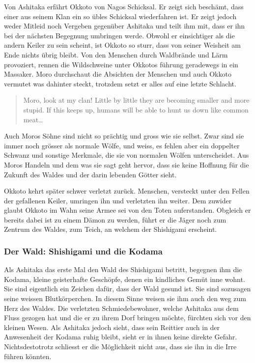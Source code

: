 Von Ashitaka erfährt Okkoto von Nagos Schicksal. Er zeigt sich beschämt, dass einer aus seinem Klan ein so übles Schicksal wiederfahren ist. Er zeigt jedoch weder Mitleid noch Vergeben gegenüber Ashitaka und teilt ihm mit, dass er ihn bei der nächsten Begegnung umbringen werde. Obwohl er einsichtiger als die andern Keiler zu sein scheint, ist Okkoto so sturr, dass von seiner Weisheit am Ende nichts übrig bleibt. Von den Menschen durch Waldbrände und Lärm provoziert, rennen die Wildschweine unter Okkotos führung geradewegs in ein Massaker. Moro durchschaut die Absichten der Menschen und auch Okkoto vermutet was dahinter steckt, trotzdem setzt er alles auf eine letzte Schlacht.  

\begin{quote}
\glqq Moro, look at my clan! Little by little they are becoming smaller and more stupid. If this keeps up, humans will be able to hunt us down like common meat\dots\grqq {} 
\end{quote}

Auch Moros Söhne sind nicht so prächtig und gross wie sie selbst. Zwar sind sie immer noch grösser als normale Wölfe, und weiss, es fehlen aber ein doppelter Schwanz und sonstige Merkmale, die sie von normalen Wölfen unterscheidet. Aus Moros Handeln und dem was sie sagt geht hervor, dass sie keine Hoffnung für die Zukunft des Waldes und der darin lebenden Götter sieht. 

Okkoto kehrt später schwer verletzt zurück. Menschen, versteckt unter den Fellen der gefallenen Keiler, umringen ihn und verletzten ihn weiter. Dem zuwider glaubt Okkoto im Wahn seine Armee sei von den Toten auferstanden. Obgleich er bereits dabei ist zu einem Dämon zu werden, führt er die Jäger noch zum Zentrum des Waldes, zum Teich, an welchem der Shishigami erscheint.  

\subsubsection*{Der Wald: Shishigami und die Kodama} 
Als Ashitaka das erste Mal den Wald des Shishigami betritt, begegnen ihm die Kodama, kleine geisterhafte Geschöpfe, denen ein kindliches Gemüt inne wohnt. Sie sind eigentlich ein Zeichen dafür, dass der Wald gesund ist. Sie sind sozusagen seine weissen Blutkörperchen. In diesem Sinne weisen sie ihm auch den weg zum Herz des Waldes. Die verletzten Schmiedebewohner, welche Ashitaka aus dem Fluss gezogen hat und die er zu ihrem Dorf bringen möchte, fürchten sich vor den kleinen Wesen. Als Ashitaka jedoch sieht, dass sein Reittier auch in der Anwesenheit der Kodama ruhig bleibt, sieht er in ihnen keine direkte Gefahr. Nichtsdestotrotz schliesst er die Möglichkeit nicht aus, dass sie ihn in die Irre führen könnten. 

